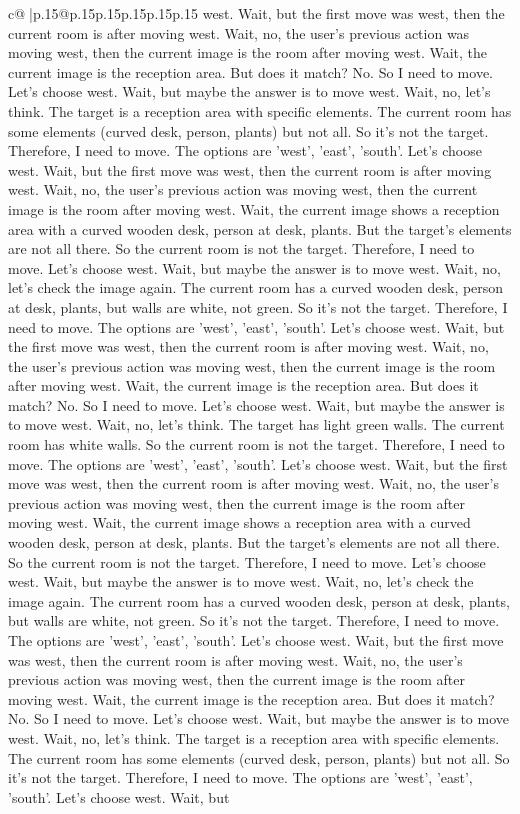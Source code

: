 \documentclass{article}
\begin{document}
{\begin{supertabular}{c@{$\;$}|p{.15\linewidth}@{}p{.15\linewidth}p{.15\linewidth}p{.15\linewidth}p{.15\linewidth}p{.15\linewidth}}
{{{west. Wait, but the first move was west, then the current room is after moving west. Wait, no, the user's previous action was moving west, then the current image is the room after moving west. Wait, the current image is the reception area. But does it match? No. So I need to move. Let's choose west. Wait, but maybe the answer is to move west. Wait, no, let's think. The target is a reception area with specific elements. The current room has some elements (curved desk, person, plants) but not all. So it's not the target. Therefore, I need to move. The options are 'west', 'east', 'south'. Let's choose west. Wait, but the first move was west, then the current room is after moving west. Wait, no, the user's previous action was moving west, then the current image is the room after moving west. Wait, the current image shows a reception area with a curved wooden desk, person at desk, plants. But the target's elements are not all there. So the current room is not the target. Therefore, I need to move. Let's choose west. Wait, but maybe the answer is to move west. Wait, no, let's check the image again. The current room has a curved wooden desk, person at desk, plants, but walls are white, not green. So it's not the target. Therefore, I need to move. The options are 'west', 'east', 'south'. Let's choose west. Wait, but the first move was west, then the current room is after moving west. Wait, no, the user's previous action was moving west, then the current image is the room after moving west. Wait, the current image is the reception area. But does it match? No. So I need to move. Let's choose west. Wait, but maybe the answer is to move west. Wait, no, let's think. The target has light green walls. The current room has white walls. So the current room is not the target. Therefore, I need to move. The options are 'west', 'east', 'south'. Let's choose west. Wait, but the first move was west, then the current room is after moving west. Wait, no, the user's previous action was moving west, then the current image is the room after moving west. Wait, the current image shows a reception area with a curved wooden desk, person at desk, plants. But the target's elements are not all there. So the current room is not the target. Therefore, I need to move. Let's choose west. Wait, but maybe the answer is to move west. Wait, no, let's check the image again. The current room has a curved wooden desk, person at desk, plants, but walls are white, not green. So it's not the target. Therefore, I need to move. The options are 'west', 'east', 'south'. Let's choose west. Wait, but the first move was west, then the current room is after moving west. Wait, no, the user's previous action was moving west, then the current image is the room after moving west. Wait, the current image is the reception area. But does it match? No. So I need to move. Let's choose west. Wait, but maybe the answer is to move west. Wait, no, let's think. The target is a reception area with specific elements. The current room has some elements (curved desk, person, plants) but not all. So it's not the target. Therefore, I need to move. The options are 'west', 'east', 'south'. Let's choose west. Wait, but }}}
\end{supertabular}}
\end{document}
